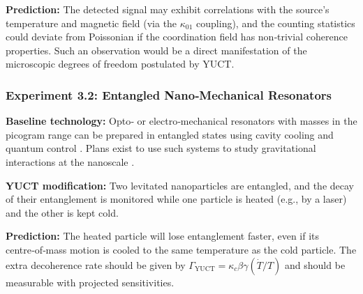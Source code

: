 \documentclass[12pt]{article}
\theoremstyle{remark}
\begin{document}
	\textbf{Prediction:} The detected signal may exhibit correlations with the source’s temperature and magnetic
	field (via the \(\kappa_{01}\) coupling), and the counting statistics could deviate from Poissonian if the
	coordination field has non‑trivial coherence properties.  
	Such an observation would be a direct manifestation of the microscopic degrees of freedom postulated by YUCT.
	
	\subsubsection{Experiment 3.2: Entangled Nano‑Mechanical Resonators}
	
	\textbf{Baseline technology:} Opto‑ or electro‑mechanical resonators with masses in the picogram range can be
	prepared in entangled states using cavity cooling and quantum control \cite{Aspelmeyer2014}.  
	Plans exist to use such systems to study gravitational interactions at the nanoscale \cite{Geraci2010}.
	
	\textbf{YUCT modification:} Two levitated nanoparticles are entangled, and the decay of their entanglement is
	monitored while one particle is heated (e.g., by a laser) and the other is kept cold.
	
	\textbf{Prediction:} The heated particle will lose entanglement faster, even if its centre‑of‑mass motion is
	cooled to the same temperature as the cold particle.  
	The extra decoherence rate should be given by \(\Gamma_{\mathrm{YUCT}} = \kappa_c \beta\gamma (\dot{T}/T)\) and
	should be measurable with projected sensitivities.
	
\end{document}
